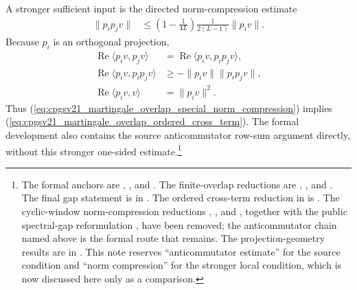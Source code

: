\documentclass{article}
\begin{document}
A stronger sufficient input is the directed norm-compression estimate
\begin{align}
    \lVert p_ip_jv\rVert
     & \leq
    \left(1-\frac{1}{4L}\right)
    \frac{1}{2(L-1)}
    \lVert p_iv\rVert.
    \label{eq:cpgsv21_martingale_overlap_special_norm_compression}
\end{align}
Because $p_i$ is an orthogonal projection,
\begin{align}
    \operatorname{Re}\langle p_iv,p_jv\rangle
     & =\operatorname{Re}\langle p_iv,p_ip_jv\rangle,
    \label{eq:cpgsv21_martingale_overlap_projected_cross_term}      \\
    \operatorname{Re}\langle p_iv,p_ip_jv\rangle
     & \geq-\lVert p_iv\rVert\lVert p_ip_jv\rVert,
    \label{eq:cpgsv21_martingale_overlap_cross_term_cauchy_schwarz} \\
    \operatorname{Re}\langle p_iv,v\rangle
     & =\lVert p_iv\rVert^2.
    \label{eq:cpgsv21_martingale_overlap_projection_quadratic_form}
\end{align}
Thus
(\ref{eq:cpgsv21_martingale_overlap_special_norm_compression}) implies
(\ref{eq:cpgsv21_martingale_overlap_ordered_cross_term}). The formal
development also contains the source anticommutator row-sum argument directly,
without this stronger one-sided estimate.\footnote{The formal anchors are
    ,
    , and
    .
    The finite-overlap reductions are
    ,
    ,
    and
    .
    The final gap statement is
     in
    .
    The ordered cross-term reduction in
     is
    .
    The cyclic-window norm-compression reductions
    ,
    ,
    and
    ,
    together with the public spectral-gap reformulation
    , have
    been removed; the anticommutator chain named above is the formal route that
    remains.
    The projection-geometry results are in
    . This note reserves
    ``anticommutator estimate'' for the source condition and ``norm
    compression'' for the stronger local condition, which is now discussed here
    only as a comparison.}
\end{document}
